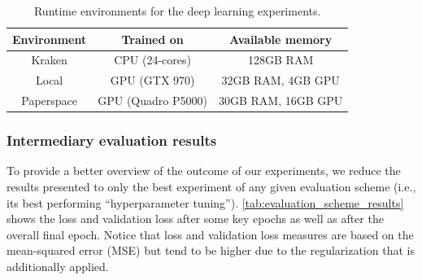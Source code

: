\begin{table}[h!]
  \centering
  \begin{tabular}{ ccc }
    \toprule
    \textbf{Environment} & \textbf{Trained on} & \textbf{Available memory} \\
    \midrule
    Kraken & CPU (24-cores) & 128GB RAM \\
    Local & GPU (GTX 970) & 32GB RAM, 4GB GPU \\
    Paperspace & GPU (Quadro P5000) & 30GB RAM, 16GB GPU \\
    \bottomrule
  \end{tabular}
  \caption{Runtime environments for the deep learning experiments.}
\label{tab:experimental_environments}
\end{table}

\subsubsection{Intermediary evaluation results}
To provide a better overview of the outcome of our experiments, we reduce the results presented to only the best experiment of any given evaluation scheme (i.e., its best performing ``hyperparameter tuning''). \cref{tab:evaluation_scheme_results} shows the loss and validation loss after some key epochs as well as after the overall final epoch. Notice that loss and validation loss measures are based on the mean-squared error (MSE) but tend to be higher due to the regularization that is additionally applied.

